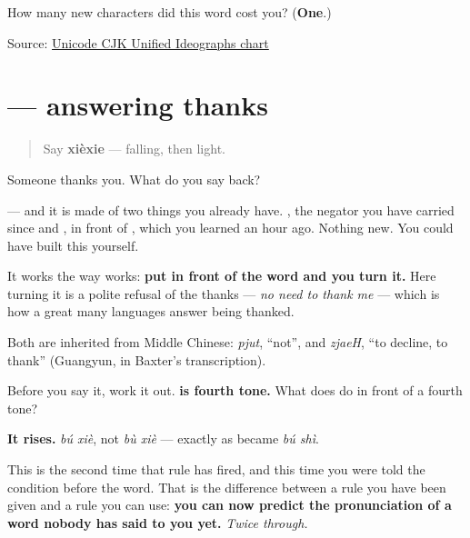 \begin{tcolorbox}[breakable,colback=teal!4,colframe=teal!35!black,title={Before you move on}]
How many new characters did this word cost you? (\textbf{One}.)

Source: \href{https://www.unicode.org/charts/PDF/U4E00.pdf}{Unicode CJK Unified Ideographs chart}
\end{tcolorbox}
\section[\texorpdfstring{\zh{不谢} (bú xiè)}{不谢 (bú xiè)}]{ — answering thanks}

\label{lesson:ZH-C10-buxie}



\begin{quote}
Say \textbf{xièxie} — falling, then light.
\end{quote}

\begin{cousinweb}
Someone thanks you. What do you say back?

\begin{quote}
\end{quote}

\textbf{} — and it is made of two things you already have. \textbf{}, the negator you have carried since  and , in front of \textbf{}, which you learned an hour ago. Nothing new. You could have built this yourself.

It works the way  works: \textbf{put  in front of the word and you turn it.} Here turning it is a polite refusal of the thanks — \emph{no need to thank me} — which is how a great many languages answer being thanked.

Both are inherited from Middle Chinese: \emph{pjut}, \textquotedblleft{}not\textquotedblright{}, and \emph{zjaeH}, \textquotedblleft{}to decline, to thank\textquotedblright{} (Guangyun, in Baxter's transcription).
\end{cousinweb}

\begin{sounds}
Before you say it, work it out. \textbf{ is fourth tone.} What does  do in front of a fourth tone?

\textbf{It rises.} \emph{bú xiè}, not \emph{bù xiè} — exactly as  became \emph{bú shì}.

This is the second time that rule has fired, and this time you were told the condition before the word. That is the difference between a rule you have been given and a rule you can use: \textbf{you can now predict the pronunciation of a word nobody has said to you yet.} \emph{Twice through.}
\end{sounds}

